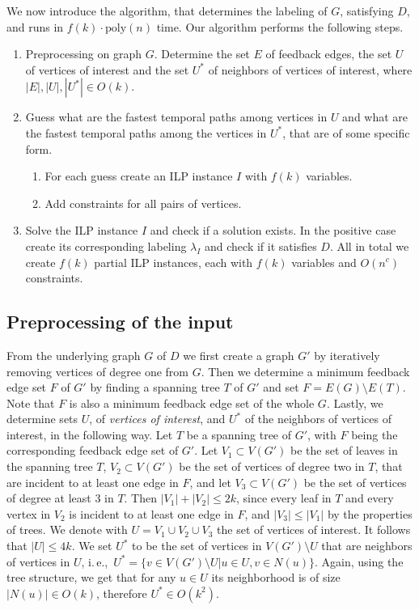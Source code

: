 \documentclass[11pt,a4paper]{article}
\theoremstyle{remark}
\theoremstyle{definition}
\newcommand{\ie}{i.\,e.,\ }
\begin{document}
We now introduce the algorithm, that determines the labeling of $G$, satisfying $D$, and runs in $f(k) \cdot \text{poly}(n)$ time.
Our algorithm performs the following steps.
\begin{enumerate}
    \item Preprocessing on graph $G$. Determine the set $E$ of feedback edges, the set $U$ of vertices of interest and the set $U^*$ of neighbors of vertices of interest, where $|E|, |U|, |U^*| \in O(k)$.
    \item Guess what are the fastest temporal paths among vertices in $U$ and 
    what are the fastest temporal paths among the vertices in $U^*$, that are of some specific form.
    \begin{enumerate}
        \item For each guess create an ILP instance $I$ with $f(k)$ variables.
        \item Add constraints for all pairs of vertices.
    \end{enumerate}
    \item Solve the ILP instance $I$ and check if a solution exists. In the positive case create its corresponding labeling $\lambda_I$ and check if it satisfies $D$.
    All in total we create $f(k)$ partial ILP instances, each with $f(k)$ variables and $O(n^c)$ constraints.
\end{enumerate}

\subsection{Preprocessing of the input}
From the underlying graph $G$ of $D$ we first create a graph $G'$ by
iteratively removing vertices of degree one from $G$.
Then we determine a minimum feedback edge set $F$ of $G'$ by finding a spanning tree $T$ of $G'$ and set $F = E(G) \setminus E(T)$. 
Note that $F$ is also a minimum feedback edge set of the whole $G$.
Lastly, we determine sets $U$, of \emph{vertices of interest}, and $U^*$ of the neighbors of vertices of interest, in the following way.
Let $T$ be a spanning tree of $G'$, with $F$ being the corresponding feedback edge set of $G'$.
Let $V_1 \subset V(G')$ be the set of leaves in the spanning tree $T$, $V_2 \subset V(G')$ be the set of vertices of degree two in $T$, that are incident to at least one edge in $F$, 
and let $V_3 \subset V(G')$ be the set of vertices of degree at least $3$ in $T$. 
Then $|V_1| + |V_2| \leq 2k$, since every leaf in $T$ and every vertex in $V_2$ is incident to at least one edge in $F$,
and $|V_3| \leq |V_1|$ by the properties of trees.
We denote with $U = V_1 \cup V_2 \cup V_3$ the set of vertices of interest. It follows that $|U| \leq 4k$.
We set $U^*$ to be the set of vertices in $V(G') \setminus U$ that are neighbors of vertices in $U$, \ie $U^* = \{v \in V(G') \setminus U | u \in U, v \in N(u)\}$.
Again, using the tree structure, we get that for any $u \in U$ its neighborhood is of size $|N(u)| \in O(k)$, therefore $U^* \in O(k^2)$.
\end{document}
